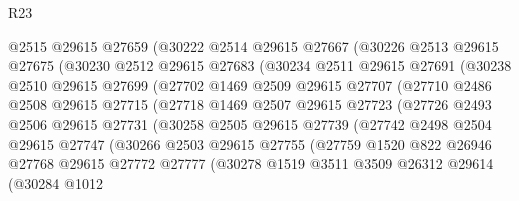 \begin{lexlean}{R23}
\begin{coremodule}
              @2515
              @29615
              @27659
              (@30222
                @2514
                @29615
                @27667
                (@30226
                  @2513
                  @29615
                  @27675
                  (@30230
                    @2512
                    @29615
                    @27683
                    (@30234
                      @2511
                      @29615
                      @27691
                      (@30238
                        @2510
                        @29615
                        @27699
                        (@27702
                          @1469
                          @2509
                          @29615
                          @27707
                          (@27710
                            @2486
                            @2508
                            @29615
                            @27715
                            (@27718
                              @1469
                              @2507
                              @29615
                              @27723
                              (@27726
                                @2493
                                @2506
                                @29615
                                @27731
                                (@30258
                                  @2505
                                  @29615
                                  @27739
                                  (@27742
                                    @2498
                                    @2504
                                    @29615
                                    @27747
                                    (@30266
                                      @2503
                                      @29615
                                      @27755
                                      (@27759
                                        @1520
                                        @822
                                        @26946
                                        @27768
                                        @29615
                                        @27772
                                        @27777
                                        (@30278
                                          @1519
                                          @3511
                                          @3509
                                          @26312
                                          @29614
                                          (@30284
                                            @1012

\end{coremodule}
\end{lexlean}
